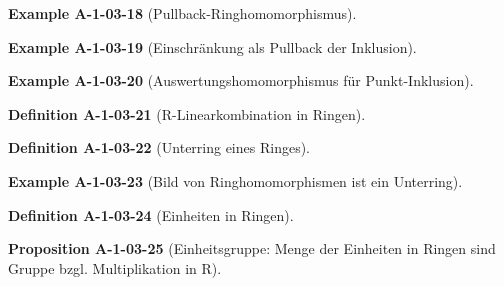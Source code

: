 \documentclass[10pt, letterpaper]{article}
\newcommand{\CustomHeading}[3]{%
  \par\medskip\noindent%
  \textbf{#1 #2} \textnormal{(#3)}.\enskip%
}
\newenvironment{DEF}[2]{\CustomHeading{Definition}{#1}{#2}}{}
\newenvironment{PROP}[2]{\CustomHeading{Proposition}{#1}{#2}}{}
\newenvironment{EXA}[2]{\CustomHeading{Example}{#1}{#2}}{}
\begin{document}
\begin{EXA}{A-1-03-18}{Pullback-Ringhomomorphismus}
\end{EXA}


\begin{EXA}{A-1-03-19}{Einschränkung als Pullback der Inklusion}
\end{EXA}


\begin{EXA}{A-1-03-20}{Auswertungshomomorphismus für Punkt-Inklusion}
\end{EXA}


\begin{DEF}{A-1-03-21}{R-Linearkombination in Ringen}
\end{DEF}


\begin{DEF}{A-1-03-22}{Unterring eines Ringes}
\end{DEF}


\begin{EXA}{A-1-03-23}{Bild von Ringhomomorphismen ist ein Unterring}
\end{EXA}


\begin{DEF}{A-1-03-24}{Einheiten in Ringen}
\end{DEF}


\begin{PROP}{A-1-03-25}{Einheitsgruppe: Menge der Einheiten in Ringen sind Gruppe bzgl. Multiplikation in R}
\end{PROP}
\end{document}
